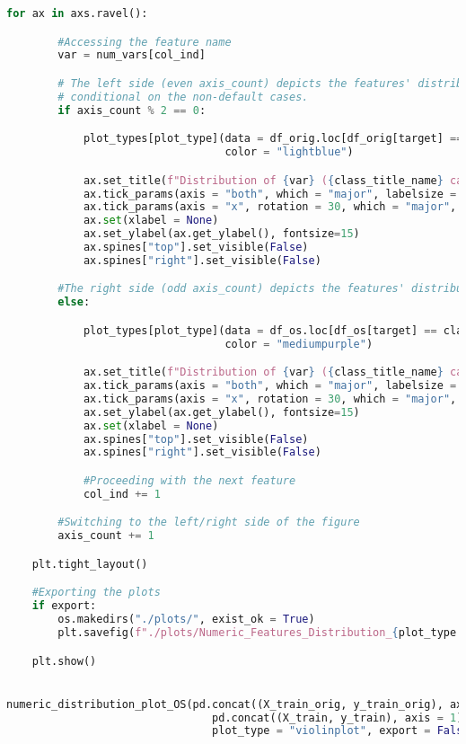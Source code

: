 \begin{lstlisting}[language=Python, basicstyle=\footnotesize\ttfamily]
    for ax in axs.ravel():

        #Accessing the feature name
        var = num_vars[col_ind]

        # The left side (even axis_count) depicts the features' distribution
        # conditional on the non-default cases.
        if axis_count % 2 == 0:

            plot_types[plot_type](data = df_orig.loc[df_orig[target] == class_val], y = var, ax = ax,
                                  color = "lightblue")

            ax.set_title(f"Distribution of {var} ({class_title_name} cases)", size = 17)
            ax.tick_params(axis = "both", which = "major", labelsize = 15)
            ax.tick_params(axis = "x", rotation = 30, which = "major", labelsize = 15)
            ax.set(xlabel = None)
            ax.set_ylabel(ax.get_ylabel(), fontsize=15)
            ax.spines["top"].set_visible(False)
            ax.spines["right"].set_visible(False)

        #The right side (odd axis_count) depicts the features' distribution conditional on the default cases.
        else:

            plot_types[plot_type](data = df_os.loc[df_os[target] == class_val], y = var, ax = ax,
                                  color = "mediumpurple")

            ax.set_title(f"Distribution of {var} ({class_title_name} cases) - Oversampled", size = 17)
            ax.tick_params(axis = "both", which = "major", labelsize = 15)
            ax.tick_params(axis = "x", rotation = 30, which = "major", labelsize = 15)
            ax.set_ylabel(ax.get_ylabel(), fontsize=15)
            ax.set(xlabel = None)
            ax.spines["top"].set_visible(False)
            ax.spines["right"].set_visible(False)

            #Proceeding with the next feature
            col_ind += 1

        #Switching to the left/right side of the figure
        axis_count += 1

    plt.tight_layout()

    #Exporting the plots
    if export:
        os.makedirs("./plots/", exist_ok = True)
        plt.savefig(f"./plots/Numeric_Features_Distribution_{plot_type.capitalize()}s.jpg", dpi = 300)

    plt.show()


numeric_distribution_plot_OS(pd.concat((X_train_orig, y_train_orig), axis = 1),
                                pd.concat((X_train, y_train), axis = 1), num_vars,
                                plot_type = "violinplot", export = False)


\end{lstlisting}

